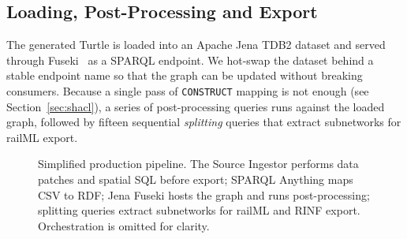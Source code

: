 \documentclass[twocolumn]{ceurart}
\begin{document}
\subsection{Loading, Post-Processing and Export}

The generated Turtle is loaded into an Apache Jena TDB2 dataset and served
through Fuseki~\cite{jena} as a SPARQL endpoint. We hot-swap the dataset behind
a stable endpoint name so that the graph can be updated without breaking
consumers. Because a single pass of \texttt{CONSTRUCT} mapping is not enough (see
Section~\ref{sec:shacl}), a series of post-processing queries runs against the
loaded graph, followed by fifteen sequential \emph{splitting} queries that
extract subnetworks for railML export.

\begin{figure}[t]
  \centering
  \caption{Simplified production pipeline. The Source Ingestor performs data
    patches and spatial SQL before export; SPARQL Anything maps CSV to RDF;
    Jena Fuseki hosts the graph and runs post-processing; splitting queries
    extract subnetworks for railML and RINF export. Orchestration is omitted
    for clarity.}
  \label{fig:pipeline}
\end{figure}
\end{document}
